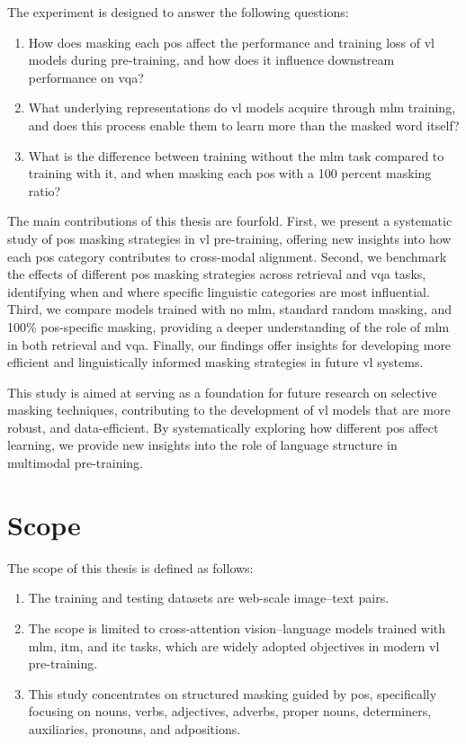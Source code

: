 The experiment is designed to answer the following questions:
\begin{enumerate}  
    \item How does masking each \acrshort{pos} affect the performance and training loss of \acrshort{vl} models during pre-training, and how does it influence downstream performance on \acrfull{vqa}?
    \item What underlying representations do \acrshort{vl} models acquire through \acrshort{mlm} training, and does this process enable them to learn more than the masked word itself?
    \item What is the difference between training without the \acrshort{mlm} task compared to training with it, and when masking each \acrshort{pos} with a 100 percent masking ratio?
\end{enumerate}

The main contributions of this thesis are fourfold.
First, we present a systematic study of \acrshort{pos} masking strategies in \acrshort{vl} pre-training, offering new insights into how each \acrshort{pos} category contributes to cross-modal alignment.  
Second, we benchmark the effects of different \acrshort{pos} masking strategies across retrieval and \acrshort{vqa} tasks, identifying when and where specific linguistic categories are most influential.  
Third, we compare models trained with no \acrshort{mlm}, standard random masking, and 100\% \acrshort{pos}-specific masking, providing a deeper understanding of the role of \acrshort{mlm} in both retrieval and \acrshort{vqa}.  
Finally, our findings offer insights for developing more efficient and linguistically informed masking strategies in future \acrshort{vl} systems.  

This study is aimed at serving as a foundation for future research on selective masking techniques, contributing to the development of \acrshort{vl} models that are more robust, and data-efficient.
By systematically exploring how different \acrshort{pos} affect learning, we provide new insights into the role of language structure in multimodal pre-training.

\section{Scope}  
The scope of this thesis is defined as follows:  
\begin{enumerate}  
    \item The training and testing datasets are web-scale image–text pairs.  
    \item The scope is limited to cross-attention vision–language models trained with \acrshort{mlm}, \acrshort{itm}, and \acrshort{itc} tasks, which are widely adopted objectives in modern \acrshort{vl} pre-training.
    \item This study concentrates on structured masking guided by \acrshort{pos}, specifically focusing on nouns, verbs, adjectives, adverbs, proper nouns, determiners, auxiliaries, pronouns, and adpositions.
\end{enumerate}  